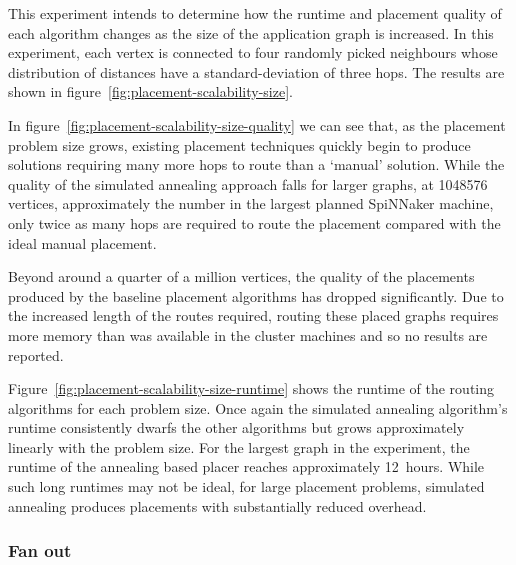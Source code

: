 				This experiment intends to determine how the runtime and placement
				quality of each algorithm changes as the size of the application graph
				is increased. In this experiment, each vertex is connected to four
				randomly picked neighbours whose distribution of distances have a
				standard-deviation of three hops. The results are shown in
				figure~\ref{fig:placement-scalability-size}.
				
				In figure~\ref{fig:placement-scalability-size-quality} we can see that,
				as the placement problem size grows, existing placement techniques
				quickly begin to produce solutions requiring many more hops to route
				than a `manual' solution. While the quality of the simulated annealing
				approach falls for larger graphs, at \num{1048576} vertices,
				approximately the number in the largest planned SpiNNaker machine, only
				twice as many hops are required to route the placement compared with
				the ideal manual placement.
				
				Beyond around a quarter of a million vertices, the quality of the
				placements produced by the baseline placement algorithms has dropped
				significantly. Due to the increased length of the routes required,
				routing these placed graphs requires more memory than was available in
				the cluster machines and so no results are reported.
				
				Figure~\ref{fig:placement-scalability-size-runtime} shows the runtime
				of the routing algorithms for each problem size. Once again the
				simulated annealing algorithm's runtime consistently dwarfs the other
				algorithms but grows approximately linearly with the problem size. For
				the largest graph in the experiment, the runtime of the annealing based
				placer reaches approximately 12~hours. While such long runtimes may not
				be ideal, for large placement problems, simulated annealing produces
				placements with substantially reduced overhead.
			
			\subsubsection{Fan out}
			
